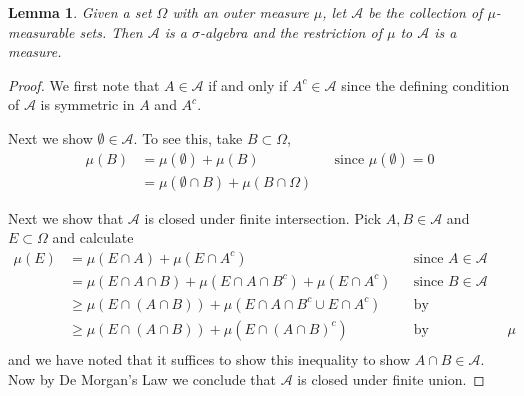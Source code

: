 \documentclass{amsart}
\newtheorem{lem}[thm]{Lemma}
\theoremstyle{remark}
\theoremstyle{definition}
\begin{document}
\begin{lem}\label{CaratheodoryRestriction}Given a set $\Omega$ with an outer measure $\mu$, let
$\mathcal{A}$ be the collection of $\mu$-measurable sets.  Then
$\mathcal{A}$ is a $\sigma$-algebra and the
  restriction of $\mu$ to $\mathcal{A}$ is a measure.
\end{lem}
\begin{proof}We first note that $A \in \mathcal{A}$ if and only if $A^c
  \in \mathcal{A}$ since the defining condition of $\mathcal{A}$ is
  symmetric in $A$ and $A^c$.

Next we show $\emptyset \in \mathcal{A}$.  To see this,
  take $B \subset \Omega$,
\begin{align*}
\mu(B) &= \mu(\emptyset) + \mu(B) & &\text{since $\mu(\emptyset) = 0$}
\\
& = \mu(\emptyset \cap B) + \mu(B \cap \Omega)
\end{align*}

Next we show that $\mathcal{A}$ is closed under finite intersection.
Pick $A, B \in \mathcal{A}$ and $E \subset \Omega$ and calculate
\begin{align*}
\mu(E) &= \mu(E \cap A) + \mu(E \cap A^c) & &\text{since $A \in
  \mathcal{A}$} \\
&= \mu(E \cap A \cap B) + \mu(E \cap A \cap B^c) +\mu(E \cap A^c) & &\text{since $B \in
  \mathcal{A}$} \\
&\geq \mu(E \cap (A \cap B)) + \mu(E \cap A \cap B^c \cup E \cap A^c)
& & \text{by subadditivity} \\
&\geq \mu(E \cap (A \cap B)) + \mu(E \cap (A \cap B)^c)
& & \text{by monotonicity of $\mu$} \\
\end{align*}
and we have noted that it suffices to show this inequality to show $A
\cap B \in \mathcal{A}$.  Now by De Morgan's Law we conclude that
$\mathcal{A}$ is closed under finite union.


\end{proof}
\end{document}

